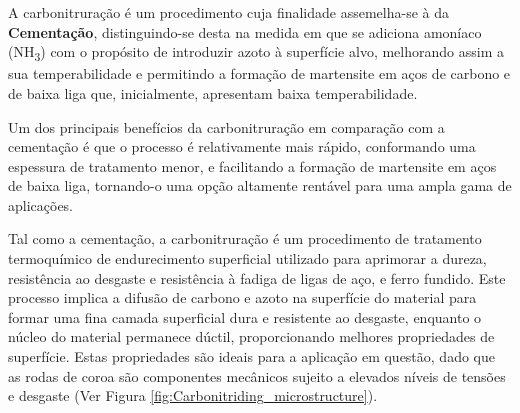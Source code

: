 A carbonitruração é um procedimento cuja finalidade assemelha-se à da \textbf{Cementação}, distinguindo-se desta na medida em que se adiciona amoníaco (NH\textsubscript{3}) com o propósito de introduzir azoto à superfície alvo, melhorando assim a sua temperabilidade e permitindo a formação de martensite em aços de carbono e de baixa liga que, inicialmente, apresentam baixa temperabilidade\cite{Herring2011}.
\par
Um dos principais benefícios da carbonitruração em comparação com a cementação é que o processo é relativamente mais rápido, conformando uma espessura de tratamento menor, e facilitando a formação de martensite em aços de baixa liga, tornando-o uma opção altamente rentável para uma ampla gama de aplicações.
\par
Tal como a cementação, a carbonitruração é um procedimento de tratamento termoquímico de endurecimento superficial utilizado para aprimorar a dureza, resistência ao desgaste e resistência à fadiga de ligas de aço, e ferro fundido. Este processo implica a difusão de carbono e azoto na superfície do material para formar uma fina camada superficial dura e resistente ao desgaste, enquanto o núcleo do material permanece dúctil, proporcionando melhores propriedades de superfície. Estas propriedades são ideais para a aplicação em questão, dado que as rodas de coroa são componentes mecânicos sujeito a elevados níveis de tensões e desgaste\cite{Bryson2009} (Ver Figura \ref{fig:Carbonitriding_microstructure}).

